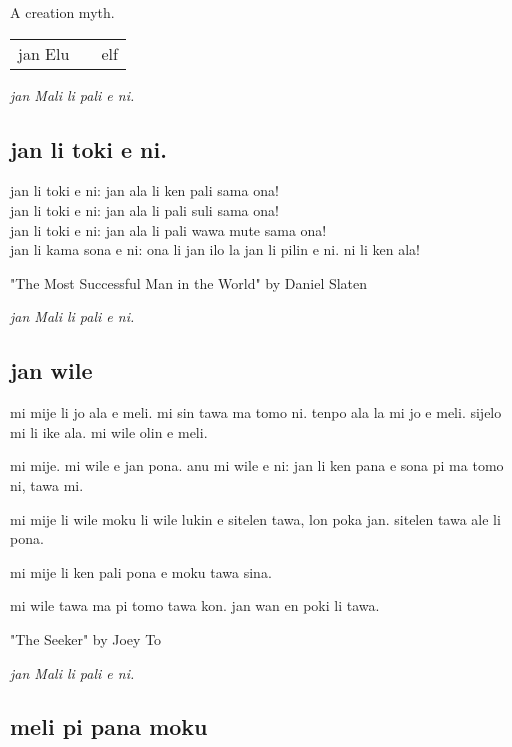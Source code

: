 A creation myth.

\begin{supertabular}{p{5,5cm}|ll}
jan Elu && elf \\
\end{supertabular}

\textit{jan Mali li pali e ni. \cite{www:astrodonunt:01}}

\subsection{jan li toki e ni.}

jan li toki e ni: jan ala li ken pali sama ona! \\
jan li toki e ni: jan ala li pali suli sama ona! \\
jan li toki e ni: jan ala li pali wawa mute sama ona! \\
jan li kama sona e ni: ona li jan ilo la jan li pilin e ni. ni li ken ala! 

"The Most Successful Man in the World" by Daniel Slaten

\textit{jan Mali li pali e ni. \cite{www:astrodonunt:01}}

\newpage
\subsection{jan wile}

mi mije li jo ala e meli. 
mi sin tawa ma tomo ni. 
tenpo ala la mi jo e meli. 
sijelo mi li ike ala. 
mi wile olin e meli.

mi mije. 
mi wile e jan pona. 
anu mi wile e ni: jan li ken pana e sona pi ma tomo ni, tawa mi.

mi mije li wile moku li wile lukin e sitelen tawa, lon poka jan. 
sitelen tawa ale li pona.

mi mije li ken pali pona e moku tawa sina.

mi wile tawa ma pi tomo tawa kon. 
jan wan en poki li tawa.

"The Seeker" by Joey To

\textit{jan Mali li pali e ni. \cite{www:astrodonunt:01}}

\subsection{meli pi pana moku}

